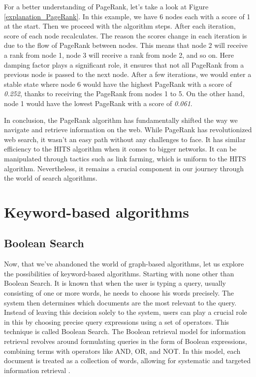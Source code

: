 \documentclass[10pt,english,a4paper]{article}
\begin{document}
For a better understanding of PageRank, let's take a look at Figure \ref{explanation_PageRank}. In this example, we have 6 nodes each with a score of 1 at the start. Then we proceed with the algorithm steps. After each iteration, score of each node recalculates. The reason the scores change in each iteration is due to the flow of PageRank between nodes. This means that node 2 will receive a rank from node 1, node 3 will receive a rank from node 2, and so on. Here damping factor plays a significant role, it ensures that not all PageRank from a previous node is passed to the next node. After a few iterations, we would enter a stable state where node 6 would have the highest PageRank with a score of \textit{0.252}, thanks to receiving the PageRank from nodes 1 to 5. On the other hand, node 1 would have the lowest PageRank with a score of \textit{0.061}.

In conclusion, the PageRank algorithm has fundamentally shifted the way we navigate and retrieve information on the web. While PageRank has revolutionized web search, it wasn't an easy path without any challenges to face. It has similar efficiency to the HITS algorithm when it comes to bigger networks. It can be manipulated through tactics such as link farming, which is uniform to the HITS algorithm. Nevertheless, it remains a crucial component in our journey through the world of search algorithms.
\section{Keyword-based algorithms}
\subsection{Boolean Search}\label{boolean_search}
Now, that we've abandoned the world of graph-based algorithms, let us explore the possibilities of keyword-based algorithms. Starting with none other than Boolean Search. It is known that when the user is typing a query, usually consisting of one or more words, he needs to choose his words precisely. The system then determines which documents are the most relevant to the query. Instead of leaving this decision solely to the system, users can play a crucial role in this by choosing precise query expressions using a set of operators.  This technique is called Boolean Search. The Boolean retrieval model for information retrieval revolves around formulating queries in the form of Boolean expressions, combining terms with operators like AND, OR, and NOT. In this model, each document is treated as a collection of words, allowing for systematic and targeted information retrieval \cite{boolean_search_article}.
\end{document}
